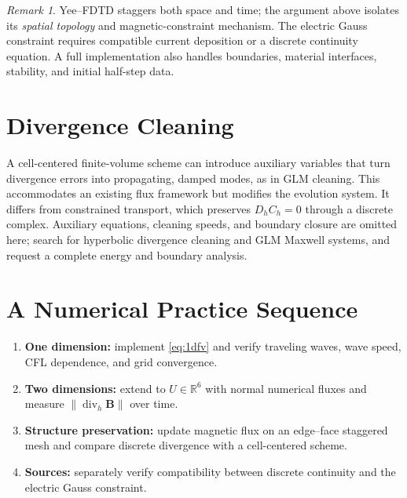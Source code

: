 \documentclass[11pt,openany]{book}
\numberwithin{equation}{chapter}
\theoremstyle{definition}
\theoremstyle{remark}
\newtheorem{remark}[theorem]{Remark}
\newcommand{\RR}{\mathbb R}
\newcommand{\Div}{\operatorname{div}}
\newcommand{\norm}[1]{\left\lVert #1\right\rVert}
\begin{document}
\begin{remark}
Yee--FDTD staggers both space and time; the argument above isolates its \emph{spatial topology} and magnetic-constraint mechanism.
The electric Gauss constraint requires compatible current deposition or a discrete continuity equation.
A full implementation also handles boundaries, material interfaces, stability, and initial half-step data.
\end{remark}

\section{Divergence Cleaning}
A cell-centered finite-volume scheme can introduce auxiliary variables that turn divergence errors into propagating, damped modes, as in GLM cleaning.
This accommodates an existing flux framework but modifies the evolution system.
It differs from constrained transport, which preserves $D_hC_h=0$ through a discrete complex.
Auxiliary equations, cleaning speeds, and boundary closure are omitted here; search for hyperbolic divergence cleaning and GLM Maxwell systems, and request a complete energy and boundary analysis.

\section{A Numerical Practice Sequence}
\begin{enumerate}
\item \textbf{One dimension:} implement \eqref{eq:1dfv} and verify traveling waves, wave speed, CFL dependence, and grid convergence.
\item \textbf{Two dimensions:} extend to $U\in\RR^6$ with normal numerical fluxes and measure $\norm{\Div_h\bm B}$ over time.
\item \textbf{Structure preservation:} update magnetic flux on an edge--face staggered mesh and compare discrete divergence with a cell-centered scheme.
\item \textbf{Sources:} separately verify compatibility between discrete continuity and the electric Gauss constraint.
\end{enumerate}
\end{document}
